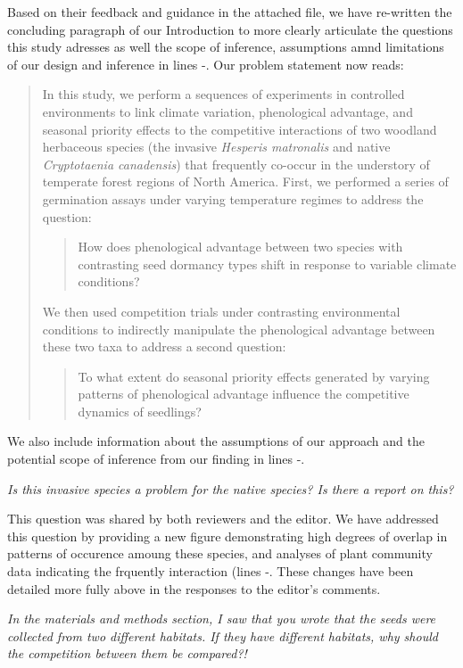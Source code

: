 \documentclass[11pt]{article}
\begin{document}
Based on their feedback and guidance in the attached file, we have re-written the concluding paragraph of our Introduction to more clearly articulate the questions this study adresses as well the scope of inference, assumptions amnd limitations of our design and inference in lines -. Our problem statement now reads:
\begin{quote}
In this study, we perform a sequences of experiments in controlled environments to link climate variation, phenological advantage, and seasonal priority effects to the competitive interactions of two woodland herbaceous species (the invasive \textit{Hesperis matronalis} and native \textit{Cryptotaenia canadensis}) that frequently co-occur in the understory of temperate forest regions of North America. First, we performed a series of germination assays under varying temperature regimes to address the question: 
\begin{quote}How does phenological advantage between two species with contrasting seed dormancy types shift in response to variable climate conditions?\end{quote}
We then used competition trials under contrasting environmental conditions to indirectly manipulate the phenological advantage between these two taxa to address a second question: \begin{quote}To what extent do seasonal priority effects generated by varying patterns of phenological advantage influence the competitive dynamics of seedlings?\end{quote}
\end{quote}

We also include information about the assumptions of our approach and the potential scope of inference from our finding in lines -. 

\emph{Is this invasive species a problem for the native species? Is there a report on this?}

This question was shared by both reviewers and the editor. We have addressed this question by providing a new figure demonstrating high degrees of overlap in patterns of occurence amoung these species, and analyses of plant community data indicating the frquently interaction (lines -. These changes have been detailed more fully above in the responses to the editor's comments.

\emph{In the materials and methods section, I saw that you wrote that the seeds were collected from two different habitats. If they have different habitats, why should the competition between them be compared?!}
\end{document}
